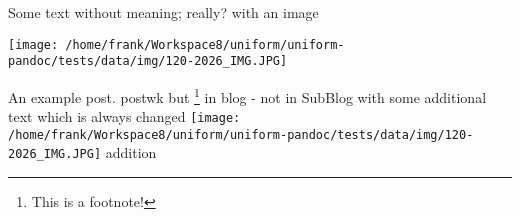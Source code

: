 \documentclass[a4paper,10pt]{scrbook}
\begin{document}
Some text without meaning; really? with an image

\texttt{[image: /home/frank/Workspace8/uniform/uniform-pandoc/tests/data/img/120-2026\_IMG.JPG]}

An example post. postwk but \footnote{This is a footnote!} in blog - not
in SubBlog with some additional text which is always changed
\texttt{[image: /home/frank/Workspace8/uniform/uniform-pandoc/tests/data/img/120-2026\_IMG.JPG]}
addition


\printindex
\end{document}
